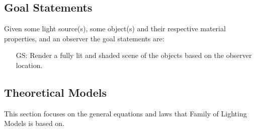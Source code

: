 \documentclass[12pt]{article}
\newcounter{goalnum} %
\newcommand{\famname}{Family of Lighting Models} %
\begin{document}
\subsection{Goal Statements}

\noindent Given some light source(s), some object(s) and their respective 
material properties, and an observer the goal statements are:

\begin{itemize}

\item[GS\refstepcounter{goalnum}\thegoalnum \label{gs-display}:] 
Render a fully lit and shaded scene of the objects based on the observer 
location.

\end{itemize}

\subsection{Theoretical Models} \label{sec_theoretical}

This section focuses on the general equations and laws that \famname{} is based
on.  %

~\newline
\end{document}
